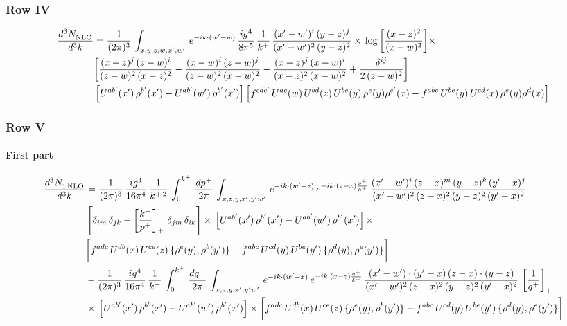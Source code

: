 \documentclass[9pt]{article}
\numberwithin{equation}{section}
\begin{document}
\subsubsection{Row IV}
\begin{align}
    \frac{d^{3}N_{\rm NLO}^{\rm}}{d^{3}k}  & =   \frac{1}{(2\pi)^{3}}\,
    \int_{x,y,z,w,x',w'}\,e^{-ik\cdot (w^\prime-w)}\, \frac{ig^{4}}{8\pi^{5}}\,\frac{1}{k^{+}}\,\frac{(x'-w')^{i}\,(y-z)^{j}}{(x'-w')^{2}\,(y-z)^{2}}\times\,\log{\left[\frac{(x-z)^{2}}{(x-w)^{2}}\right]}\times\notag \\ &  \bigg[\frac{(x-z)^{j}\,(z-w)^{i}}{(z-w)^{2}\,(x-z)^{2}} -\frac{(x-w)^{i}\,(z-w)^{j}}{(z-w)^{2}\,(x-w)^{2}}-\frac{(x-z)^{j}\,(x-w)^{i}}{(x-z)^{2}\,(x-w)^{2}}+\frac{\delta^{ij}}{2\,(z-w)^{2}}\bigg]\notag \\ &  \left[U^{ab'}(x')\,\rho^{b'}(x')-U^{ab'}(w')\,\rho^{b'}(x')\right] \left[f^{cdc'}\,U^{ac}(w)\,U^{bd}(z)\,U^{be}(y)\,\rho^{e}(y)\rho^{c'}(x)-f^{abc}\,U^{be}(y)\,U^{cd}(x)\,\rho^{e}(y)\rho^{d}(x)\right]
\end{align}
\subsubsection{Row V}
\paragraph{First part}
\begin{align}
     \frac{d^{3}N_{1\,\rm NLO}^{\rm}}{d^{3}k}  & =  \frac{1}{(2\pi)^{3}}\, \frac{ig^{4}}{16\pi^{4}}\, \frac{1}{k^{+\,2}}\,\int_{0}^{k^{+}}\, \frac{dp^{+}}{2\pi}\,\int_{x,z,y,x',y'w'}\,e^{-ik\cdot (w^\prime-z)}\,e^{-ik\cdot (z-x)\frac{p^{+}}{k^{+}}}\,\frac{(x'-w')^{i}\,(z-x)^{m}\,(y-z)^{k}\,(y'-x)^{j}}{(x'-w')^{2}\,(z-x)^{2}\,(y-z)^{2}\,(y'-x)^{2}}\,\notag \\ & \left[\delta_{im}\,\delta_{jk}-\left[\frac{k^{+}}{p^{+}}\right]_{+}\, \delta_{jm}\,\delta_{ik}\right]\times\, \left[U^{ab'}(x')\,\rho^{b'}(x')-U^{ab'}(w')\,\rho^{b'}(x')\right]\times\notag \\ & \bigg[f^{adc}\,U^{db}(x)\,U^{ce}(z)\, \{\rho^{e}(y),\rho^{b}(y')\}-f^{abc}\,U^{cd}(y)\,U^{be}(y')\, \{\rho^{d}(y),\rho^{e}(y')\}\bigg] \notag \\ & -\frac{1}{(2\pi)^{3}}\, \frac{ig^{4}}{16\pi^{4}}\, \frac{1}{k^{+}}\,\int_{0}^{k^{+}}\, \frac{dq^{+}}{2\pi}\,\int_{x,z,y,x',y'w'}\,e^{-ik\cdot (w^\prime-x)}\,e^{-ik\cdot (x-z)\frac{q^{+}}{k^{+}}}\,\frac{(x'-w')\cdot (y'-x)\,(z-x)\cdot (y-z)}{(x'-w')^{2}\,(z-x)^{2}\,(y-z)^{2}\,(y'-x)^{2}}\,\left[\frac{1}{q^{+}}\right]_{+}\notag \\ & \times\, \left[U^{ab'}(x')\,\rho^{b'}(x')-U^{ab'}(w')\,\rho^{b'}(x')\right]\times \bigg[f^{adc}\,U^{db}(x)\,U^{ce}(z)\, \{\rho^{e}(y),\rho^{b}(y')\}-f^{abc}\,U^{cd}(y)\,U^{be}(y')\, \{\rho^{d}(y),\rho^{e}(y')\}\bigg]
\end{align}
\end{document}
